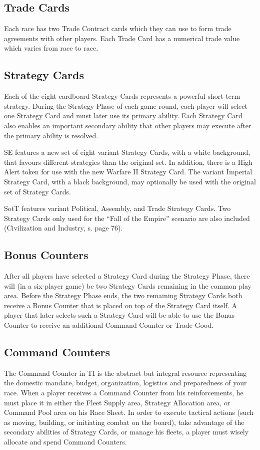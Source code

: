 \documentclass[11pt,fleqn]{book} %
\begin{document}
\subsection{Trade Cards}
Each race has two Trade Contract cards which they can use to form trade agreements with other players. Each Trade Card has a numerical trade value which varies from race to race.

\subsection{Strategy Cards}
Each of the eight cardboard Strategy Cards represents a powerful short-term strategy. During the Strategy Phase of each game round, each player will select one Strategy Card and must later use its primary ability. Each Strategy Card also enables an important secondary ability that other players may execute after the primary ability is resolved.
\begin{SEbox}
    
SE  features a new set of eight variant Strategy Cards, with a white background, that favours different strategies than the original set. In addition, there is a High Alert token for use with the new Warfare II Strategy Card. The variant Imperial Strategy Card, with a black background, may optionally be used with the original set of Strategy Cards.
\end{SEbox}
\begin{STbox}
SotT  features variant Political, Assembly, and Trade Strategy Cards. Two Strategy Cards only used for the “Fall of the Empire” scenario are also included (Civilization and Industry, s. page 76).
\end{STbox}

\subsection{Bonus Counters}
After all players have selected a Strategy Card during the Strategy Phase, there will (in a six-player game) be two Strategy Cards remaining in the common play area. Before the Strategy Phase ends, the two remaining Strategy Cards both receive a Bonus Counter that is placed on top of the Strategy Card itself. A player that later selects such a Strategy Card will be able to use the Bonus Counter to receive an additional Command Counter or Trade Good.


\subsection{Command Counters}
The Command Counter in TI is the abstract but integral resource representing the domestic mandate,
budget, organization, logistics and preparedness of your race. When a player receives a Command Counter from his reinforcements, he must place it in either the Fleet Supply area, Strategy Allocation area, or Command Pool area on his Race Sheet. In order to execute tactical actions (such as moving, building, or initiating combat on the board), take advantage of the secondary abilities of Strategy Cards, or manage his fleets, a player must wisely allocate and spend Command Counters.
\end{document}

